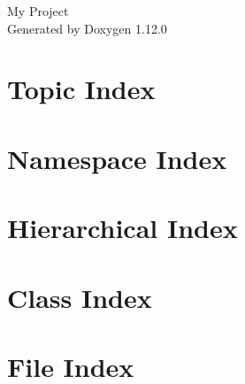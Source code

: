 \documentclass[twoside]{book}
\newcommand{\+}{\discretionary{\mbox{\scriptsize$\hookleftarrow$}}{}{}}
\newcommand{\clearemptydoublepage}{%
    \newpage{\pagestyle{empty}\cleardoublepage}%
  }
\begin{document}
  \raggedbottom
    \hypersetup{pageanchor=false,
                bookmarksnumbered=true,
                pdfencoding=unicode
               }
  \begin{titlepage}
  \vspace*{7cm}
  \begin{center}%
  {\Large My Project}\\
  \vspace*{1cm}
  {\large Generated by Doxygen 1.12.0}\\
  \end{center}
  \end{titlepage}
  \clearemptydoublepage
  \tableofcontents
  \clearemptydoublepage
  \hypersetup{pageanchor=true}




















\chapter{Topic Index}

\chapter{Namespace Index}

\chapter{Hierarchical Index}

\chapter{Class Index}

\chapter{File Index}

\end{document}
